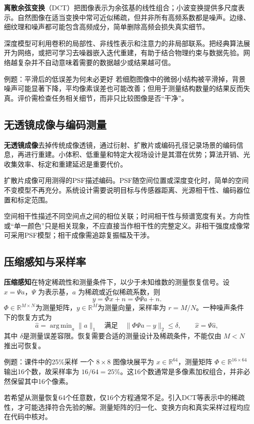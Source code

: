 \documentclass[UTF8,fontset=none,zihao=-4,a4paper]{ctexart}
\newcommand{\term}[1]{\textbf{#1}}
\DeclareMathOperator{\argmin}{arg\,min}
\begin{document}
\term{离散余弦变换}（DCT）把图像表示为余弦基的线性组合；小波变换提供多尺度表示。自然图像在适当变换中常可近似稀疏，但并非所有高频系数都是噪声。边缘、细纹理和噪声都可能包含高频成分，简单删除高频会损失真实细节。

深度模型可利用卷积的局部性、非线性表示和注意力的非局部联系。把经典算法展开为网络，或把可学习去噪器嵌入迭代重建，有助于结合物理约束与数据先验。网络越复杂并不自动意味着需要的数据越少或结果越可信。

\begin{infobox}{例题：平滑后的低误差为何未必更好}
若细胞图像中的微弱小结构被平滑掉，背景噪声可能显著下降，平均像素误差也可能改善；但用于测量结构数量的结果反而失真。评价需检查任务相关细节，而非只比较图像是否“干净”。
\end{infobox}

\subsection{无透镜成像与编码测量}
\term{无透镜成像}去掉传统成像透镜，通过衍射、扩散片或编码孔径记录场景的编码信息，再进行重建。小体积、低重量和特定大视场设计是其潜在优势；算法开销、光收集效率、标定和重建延迟是重要代价。

扩散片成像可用测得的PSF描述编码。PSF随空间位置或深度变化时，简单的空间不变模型不再充分。系统设计需要说明目标与传感器距离、光源相干性、编码器位置和标定范围。

空间相干性描述不同空间点之间的相位关联；时间相干性与频谱宽度有关。方向性或“单一颜色”只是相关现象，不应直接当作相干性的完整定义。非相干强度成像常可采用PSF模型；相干成像需追踪复振幅及干涉。

\subsection{压缩感知与采样率}
\term{压缩感知}在特定稀疏性和测量条件下，以少于未知维数的测量恢复信号。设 $x=\Psi a$，$\Psi$ 为表示基，$a$ 为稀疏或近似稀疏系数，则
\[
y=\Phi x+n=\Phi\Psi a+n.
\]
$\Phi\in\mathbb R^{M\times N}$为测量矩阵，$y\in\mathbb R^M$为测量向量，采样率为 $r=M/N$。一种噪声条件下的恢复方式为
\[
\hat a=\argmin_a\|a\|_1\quad\text{满足}\quad
\|\Phi\Psi a-y\|_2\le\delta,
\qquad \hat x=\Psi\hat a,
\]
其中 $\delta$是测量误差容限。恢复需要合适的测量设计及稀疏条件，不能仅由 $M<N$ 推出可恢复。

\begin{infobox}{例题：课件中的25\%采样}
一个 $8\times8$ 图像块展平为 $x\in\mathbb R^{64}$，测量矩阵 $\Phi\in\mathbb R^{16\times64}$ 输出16个数，故采样率为 $16/64=25\%$。这16个数通常是多像素加权组合，并非必然保留其中16个像素。
\end{infobox}
若希望从测量恢复64个任意数，仅16个方程通常不足。引入DCT等表示中的稀疏性，才可能选择符合先验的解。测量矩阵的归一化、变换方向和真实采样过程均应在代码中核对。
\end{document}
